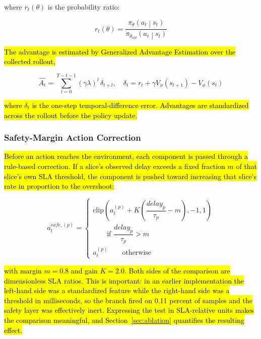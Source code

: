 \documentclass[conference]{IEEEtran}
\newcommand{\rev}[1]{\hl{#1}}
\newcommand{\m}[1]{\mbox{$#1$}}
\begin{document}
where \(r_{t}(\theta)\) is the probability ratio:

\begin{equation}\label{eq:ratio}
r_{t}(\theta) = \frac{\pi_{\theta}\left( a_{t} \middle| s_{t} \right)}{\pi_{\theta_{old}}\left( a_{t} \middle| s_{t} \right)}
\end{equation}

\rev{The advantage is estimated by Generalized Advantage Estimation over the collected rollout,}

\begin{equation}\label{eq:gae}
\widehat{A_{t}} = \sum_{l=0}^{T-t-1} (\gamma\lambda)^{l}\,\delta_{t+l},\quad \delta_{t} = r_{t} + \gamma V_{\phi}\left( s_{t + 1} \right) - V_{\phi}\left( s_{t} \right)
\end{equation}

\rev{where \m{\delta_{t}} is the one-step temporal-difference error. Advantages are standardized across the rollout before the policy update.}

\subsubsection{Safety-Margin Action Correction}

\rev{Before an action reaches the environment, each component is passed through a rule-based correction. If a slice's observed delay exceeds a fixed fraction \m{m} of that slice's own SLA threshold, the component is pushed toward increasing that slice's rate in proportion to the overshoot:}

\begin{equation}\label{eq:safety}
a_t^{safe,(p)} = \begin{cases}
\text{clip}\left(a_t^{(p)} + K\left(\dfrac{delay_p}{\tau_p} - m\right),-1,1\right) \\
\qquad \text{if } \dfrac{delay_p}{\tau_p} > m \\[8pt]
a_t^{(p)} \qquad \text{otherwise}
\end{cases}
\end{equation}

\rev{with margin \m{m=0.8} and gain \m{K=2.0}. Both sides of the comparison are dimensionless SLA ratios. This is important: in an earlier implementation the left-hand side was a standardized feature while the right-hand side was a threshold in milliseconds, so the branch fired on 0.11 percent of samples and the safety layer was effectively inert. Expressing the test in SLA-relative units makes the comparison meaningful, and Section~\ref{sec:ablation} quantifies the resulting effect.}
\end{document}
